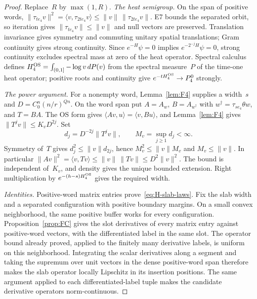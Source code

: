 \begin{proof}
Replace~$R$ by $\max(1,R)$. \emph{The heat semigroup.} On the span of positive words, $\|\tau_{te_4}v\|^2=\langle v,\tau_{2te_4}v\rangle\le\|v\|\,\|\tau_{2te_4}v\|$. E7 bounds the separated orbit, so iteration gives $\|\tau_{te_4}v\|\le\|v\|$ and null vectors are preserved. Translation invariance gives symmetry and commuting unitary spatial translations; Gram continuity gives strong continuity. Since $e^{-H}\psi=0$ implies $e^{-2^{-j}H}\psi=0$, strong continuity excludes spectral mass at zero of the heat operator. Spectral calculus~\cite[Theorem~2.5.1 and Proposition~4.2.3]{Landsman1998} defines $H_4^{\rm OS}=\int_{(0,1]}-\log v\,dP(v)$ from the spectral measure~$P$ of the time-one heat operator; positive roots and continuity give $e^{-tH_4^{\rm OS}}\to P_4^0$ strongly.

\emph{The power argument.} For a nonempty word, Lemma~\ref{lem:F4} supplies a width~$s$ and $D=C_0^n(n/r)^{Qn}$. On the word span put $A=A_w$, $B=A_{w^\dagger}$ with $w^\dagger=\tau_{se_4}\theta w$, and $T=BA$. The OS form gives $\langle Av,u\rangle=\langle v,Bu\rangle$, and Lemma~\ref{lem:F4} gives $\|T^jv\|\le K_vD^{2j}$. Set
\begin{equation*}
d_j=D^{-2j}\|T^jv\|,\qquad M_v=\sup_{j\ge1}d_j<\infty.
\end{equation*}
Symmetry of~$T$ gives $d_j^2\le\|v\|d_{2j}$, hence $M_v^2\le\|v\|M_v$ and $M_v\le\|v\|$. In particular $\|Av\|^2=\langle v,Tv\rangle\le\|v\|\,\|Tv\|\le D^2\|v\|^2$. The bound is independent of~$K_v$, and density gives the unique bounded extension. Right multiplication by $e^{-(h-s)H_4^{\rm OS}}$ gives the required width.

\emph{Identities.} Positive-word matrix entries prove~\eqref{eq:H-slab-laws}. Fix the slab width and a separated configuration with positive boundary margins. On a small convex neighborhood, the same positive buffer works for every configuration. Proposition~\ref{prop:FC} gives the slot derivatives of every matrix entry against positive-word vectors, with the differentiated label in the same slot. The operator bound already proved, applied to the finitely many derivative labels, is uniform on this neighborhood. Integrating the scalar derivatives along a segment and taking the supremum over unit vectors in the dense positive-word span therefore makes the slab operator locally Lipschitz in its insertion positions. The same argument applied to each differentiated-label tuple makes the candidate derivative operators norm-continuous.


\end{proof}

